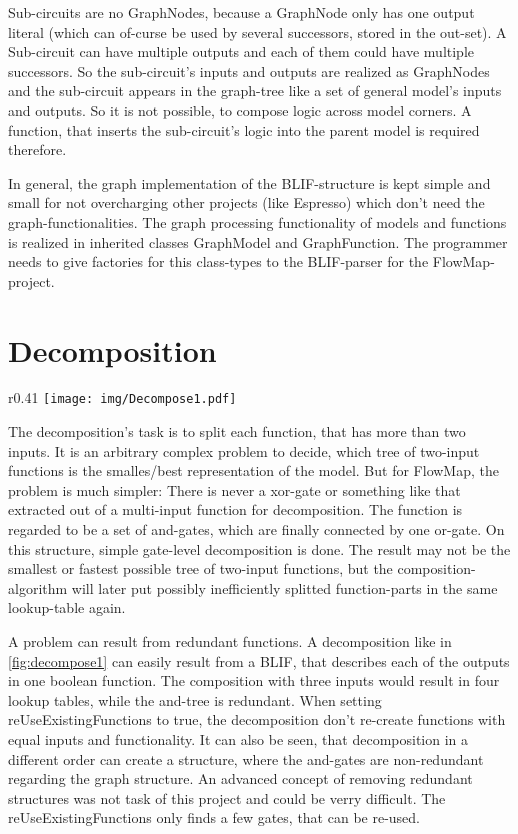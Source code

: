 \documentclass[colorback,accentcolor=tud1c,11pt]{tudreport}
\begin{document}
Sub-circuits are no GraphNodes, because a GraphNode only has one output literal (which can of-curse be used by several successors, stored in the out-set). A Sub-circuit can have multiple outputs and each of them could have multiple successors. So the sub-circuit's inputs and outputs are realized as GraphNodes and the sub-circuit appears in the graph-tree like a set of general model's inputs and outputs. So it is not possible, to compose logic across model corners. A function, that inserts the sub-circuit's logic into the parent model is required therefore.

In general, the graph implementation of the BLIF-structure is kept simple and small for not overcharging other projects (like Espresso) which don't need the graph-functionalities. The graph processing functionality of models and functions is realized in inherited classes GraphModel and GraphFunction. The programmer needs to give factories for this class-types to the BLIF-parser for the FlowMap-project.



\chapter{Decomposition}
\label{decomposition}
\begin{wrapfigure}{r}{0.41\textwidth}
\centering
\texttt{[image: img/Decompose1.pdf]}\\
\caption{Example of redundant decomposition}
\label{fig:decompose1}
\end{wrapfigure}
The decomposition's task is to split each function, that has more than two inputs. It is an arbitrary complex problem to decide, which tree of two-input functions is the smalles/best representation of the model. But for FlowMap, the problem is much simpler: There is never a xor-gate or something like that extracted out of a multi-input function for decomposition. The function is regarded to be a set of and-gates, which are finally connected by one or-gate. On this structure, simple gate-level decomposition is done. The result may not be the smallest or fastest possible tree of two-input functions, but the composition-algorithm will later put possibly inefficiently splitted function-parts in the same lookup-table again.

A problem can result from redundant functions. A decomposition like in \ref{fig:decompose1} can easily result from a BLIF, that describes each of the outputs in one boolean function. The composition with three inputs would result in four lookup tables, while the and-tree is redundant. When setting reUseExistingFunctions to true, the decomposition don't re-create functions with equal inputs and functionality. It can also be seen, that decomposition in a different order can create a structure, where the and-gates are non-redundant regarding the graph structure. An advanced concept of removing redundant structures was not task of this project and could be verry difficult. The reUseExistingFunctions only finds a few gates, that can be re-used.
\end{document}
